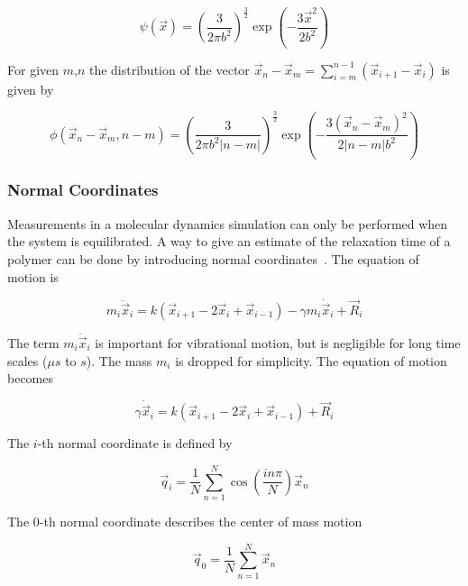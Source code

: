 \documentclass[a4paper]{article}
\begin{document}
\begin{equation}
\psi(\vec{x}) = \left( \frac{3}{2 \pi b^2} \right)^{\frac{3}{2}} \exp \left(- \frac{3 \vec{x}^2}{2 b^2} \right)
\label{eq:distribution-rouse}
\end{equation}

For given $m$,$n$ the distribution of the vector $\vec{x}_n - \vec{x}_m = \sum_{i=m}^{n-1} (\vec{x}_{i+1} - \vec{x}_i)$ is given by

\begin{equation}
\phi(\vec{x}_n - \vec{x}_m, n-m) = \left( \frac{3}{2 \pi b^2 |n-m|} \right)^{\frac{3}{2}} \exp \left(- \frac{3 (\vec{x}_n - \vec{x}_m)^2}{2 |n-m| b^2} \right)
\label{eq:distribution2-rouse}
\end{equation}

\subsubsection{Normal Coordinates}

Measurements in a molecular dynamics simulation can only be performed when the system is equilibrated. A way to give an estimate of the relaxation time of a polymer can be done by introducing normal coordinates~\cite{Teraok2002}. The equation of motion is

\begin{equation}
m_i \ddot{\vec{x}}_i = k (\vec{x}_{i+1} - 2 \vec{x}_i + \vec{x}_{i-1}) - \gamma m_i \dot{\vec{x}}_i + \vec{R}_i
\end{equation}

The term $m_i \ddot{\vec{x}}_i$ is important for vibrational motion, but is negligible for long time scales ($\mu s$ to $s$). The mass $m_i$ is dropped for simplicity. The equation of motion becomes

\begin{equation}
\gamma \dot{\vec{x}}_i = k (\vec{x}_{i+1} - 2 \vec{x}_i + \vec{x}_{i-1}) + \vec{R}_i
\end{equation}

The $i$-th normal coordinate is defined by

\begin{equation}
\vec{q}_i = \frac{1}{N} \sum_{n=1}^N \cos \left( \frac{i n \pi}{N} \right) \vec{x}_n
\end{equation}

The $0$-th normal coordinate describes the center of mass motion

\begin{equation}
\vec{q}_0 = \frac{1}{N} \sum_{n=1}^N \vec{x}_n
\end{equation}
\end{document}
